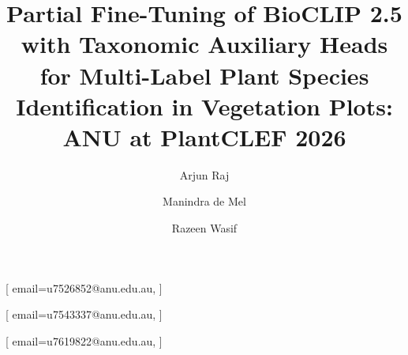 \documentclass[sigconf]{ceurart}
\begin{document}


\title{Partial Fine-Tuning of BioCLIP 2.5 with Taxonomic Auxiliary Heads for Multi-Label Plant Species Identification in Vegetation Plots: ANU at PlantCLEF 2026}

\author[1]{Arjun Raj}[%
  email=u7526852@anu.edu.au,
]
\fnmark[1]

\address[1]{The Australian National University, Canberra, ACT 2601, Australia}

\author[1]{Manindra de Mel}[%
  email=u7543337@anu.edu.au,
]
\fnmark[1]

\author[1]{Razeen Wasif}[%
  email=u7619822@anu.edu.au,
]
\fnmark[1]

\end{document}
